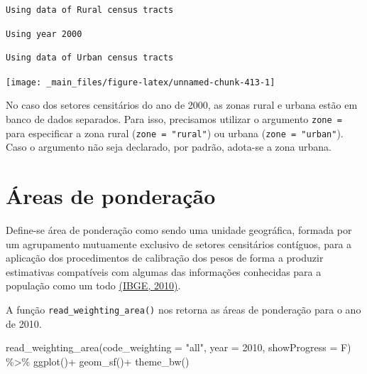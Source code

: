 \documentclass[
  brazilian,
]{book}
\newenvironment{Shaded}{\begin{snugshade}}{\end{snugshade}}
\newcommand{\AttributeTok}[1]{\textcolor[rgb]{0.77,0.63,0.00}{#1}}
\newcommand{\DecValTok}[1]{\textcolor[rgb]{0.00,0.00,0.81}{#1}}
\newcommand{\FunctionTok}[1]{\textcolor[rgb]{0.00,0.00,0.00}{#1}}
\newcommand{\NormalTok}[1]{#1}
\newcommand{\SpecialCharTok}[1]{\textcolor[rgb]{0.00,0.00,0.00}{#1}}
\newcommand{\StringTok}[1]{\textcolor[rgb]{0.31,0.60,0.02}{#1}}
\begin{document}
\begin{verbatim}
Using data of Rural census tracts
\end{verbatim}

\begin{verbatim}
Using year 2000
\end{verbatim}

\begin{verbatim}
Using data of Urban census tracts
\end{verbatim}

\begin{center}\texttt{[image: \_main\_files/figure-latex/unnamed-chunk-413-1]} \end{center}

No caso dos setores censitários do ano de 2000, as zonas rural e urbana estão em banco de dados separados. Para isso, precisamos utilizar o argumento \texttt{zone\ =} para especificar a zona rural (\texttt{zone\ =\ "rural"}) ou urbana (\texttt{zone\ =\ "urban"}). Caso o argumento não seja declarado, por padrão, adota-se a zona urbana.

\hypertarget{uxe1reas-de-ponderauxe7uxe3o}{%
\section{Áreas de ponderação}\label{uxe1reas-de-ponderauxe7uxe3o}}

Define-se área de ponderação como sendo uma unidade geográfica, formada por um agrupamento mutuamente exclusivo de setores censitários contíguos, para a aplicação dos procedimentos de calibração dos pesos de forma a produzir estimativas compatíveis com algumas das informações conhecidas para a população como um todo \href{https://www.ibge.gov.br/estatisticas/sociais/populacao/9662-censo-demografico-2010.html?edicao=9754\&t=sobre}{(IBGE, 2010)}.

A função \texttt{read\_weighting\_area()} nos retorna as áreas de ponderação para o ano de 2010.

\begin{Shaded}
\begin{Highlighting}[]
\FunctionTok{read\_weighting\_area}\NormalTok{(}\AttributeTok{code\_weighting =} \StringTok{"all"}\NormalTok{,}
                    \AttributeTok{year =} \DecValTok{2010}\NormalTok{,}
                    \AttributeTok{showProgress =}\NormalTok{ F) }\SpecialCharTok{\%\textgreater{}\%} 
  \FunctionTok{ggplot}\NormalTok{()}\SpecialCharTok{+}
  \FunctionTok{geom\_sf}\NormalTok{()}\SpecialCharTok{+}
  \FunctionTok{theme\_bw}\NormalTok{()}
\end{Highlighting}
\end{Shaded}
\end{document}
